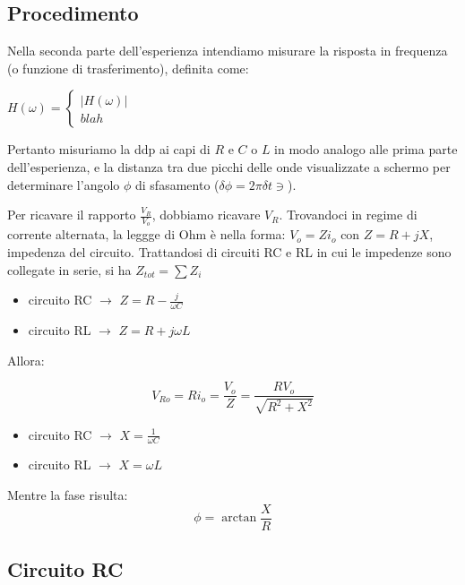 \subsection{Procedimento}
Nella seconda parte dell'esperienza intendiamo misurare la risposta in frequenza (o funzione di trasferimento), definita come:

$H\left(\omega \right) = \begin{cases}
                          |H\left(\omega \right)| \\
                          blah
                         \end{cases}
$  

Pertanto misuriamo la ddp ai capi di $R$ e $C$ o $L$ in modo analogo alle prima parte dell'esperienza, e la distanza tra due picchi delle onde visualizzate a schermo per determinare l'angolo $\phi$ di sfasamento ($\delta \phi = 2 \pi \delta t \ni$).

Per ricavare il rapporto $\frac{V_{R}}{V_{o}}$, dobbiamo ricavare $V_R$. Trovandoci in regime di corrente alternata, la leggge di Ohm è nella forma: $ V_o = Zi_o$ con $Z = R + jX$, impedenza del circuito.
Trattandosi di circuiti RC e RL in cui le impedenze sono collegate in serie, si ha $Z_{tot} = \sum Z_i$

\begin{itemize}
\item circuito RC $\rightarrow$ $Z=R-\frac{j}{\omega C}$
\item circuito RL $\rightarrow$ $Z=R+j\omega L$
\end{itemize}  

Allora: 

$$V_{Ro} = Ri_o = \frac{V_o}{Z} = \frac{RV_o}{\sqrt{R^2+X^2}} $$ 


\begin{itemize}
\item circuito RC $\rightarrow$ $X=\frac{1}{\omega C}$
\item circuito RL $\rightarrow$ $X=\omega L$
\end{itemize}

Mentre la fase risulta: 
$$\phi = \arctan \frac{X}{R} $$


\subsection{Circuito RC}


